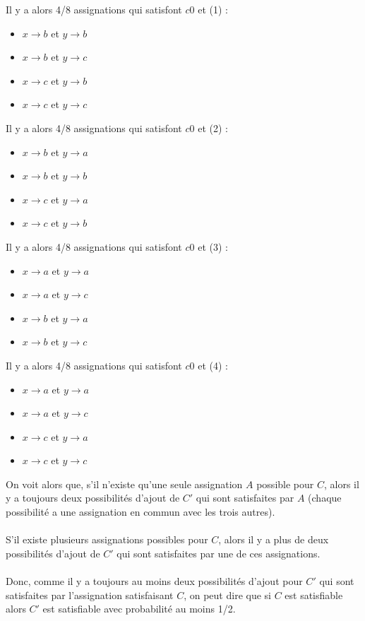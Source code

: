 \documentclass{report}
\begin{document}
\begin{itemize}
Il y a alors 4/8 assignations qui satisfont $c0$ et (1) :
\begin{itemize}
    \item[] $x \rightarrow b$ et $y \rightarrow b$
    \item[] $x \rightarrow b$ et $y \rightarrow c$
    \item[] $x \rightarrow c$ et $y \rightarrow b$
    \item[] $x \rightarrow c$ et $y \rightarrow c$
\end{itemize}
Il y a alors 4/8 assignations qui satisfont $c0$ et (2) :
\begin{itemize}
    \item[] $x \rightarrow b$ et $y \rightarrow a$
    \item[] $x \rightarrow b$ et $y \rightarrow b$
    \item[] $x \rightarrow c$ et $y \rightarrow a$
    \item[] $x \rightarrow c$ et $y \rightarrow b$
\end{itemize}
Il y a alors 4/8 assignations qui satisfont $c0$ et (3) :
\begin{itemize}
    \item[] $x \rightarrow a$ et $y \rightarrow a$
    \item[] $x \rightarrow a$ et $y \rightarrow c$
    \item[] $x \rightarrow b$ et $y \rightarrow a$
    \item[] $x \rightarrow b$ et $y \rightarrow c$
\end{itemize}
Il y a alors 4/8 assignations qui satisfont $c0$ et (4) :
\begin{itemize}
    \item[] $x \rightarrow a$ et $y \rightarrow a$
    \item[] $x \rightarrow a$ et $y \rightarrow c$
    \item[] $x \rightarrow c$ et $y \rightarrow a$
    \item[] $x \rightarrow c$ et $y \rightarrow c$
\end{itemize}

On voit alors que, s'il n'existe qu'une seule assignation $A$ possible pour $C$, alors il y a toujours deux possibilités d'ajout de $C'$ qui sont satisfaites par $A$ (chaque possibilité a une assignation en commun avec les trois autres).\\\\
S'il existe plusieurs assignations possibles pour $C$, alors il y a plus de deux possibilités d'ajout de $C'$ qui sont satisfaites par une de ces assignations.\\\\
Donc, comme il y a toujours au moins deux possibilités d'ajout pour $C'$ qui sont satisfaites par l'assignation satisfaisant $C$, on peut dire que si $C$ est satisfiable alors $C'$ est satisfiable avec probabilité au moins 1/2.
\end{itemize}
\end{document}
